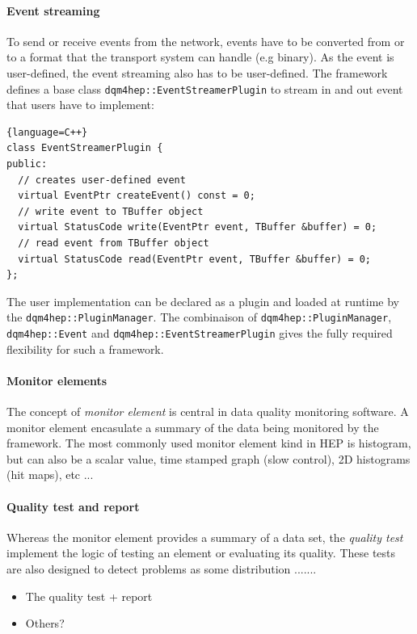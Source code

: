 \documentclass{webofc}
\begin{document}
\paragraph{Event streaming}

To send or receive events from the network, events have to be converted from or to a format that the transport system can handle (e.g binary). 
As the event is user-defined, the event streaming also has to be user-defined. 
The framework defines a base class \texttt{dqm4hep::EventStreamerPlugin} to stream in and out event that users have to implement:

\begin{lstlisting}{language=C++}
class EventStreamerPlugin {
public:
  // creates user-defined event
  virtual EventPtr createEvent() const = 0;
  // write event to TBuffer object
  virtual StatusCode write(EventPtr event, TBuffer &buffer) = 0;
  // read event from TBuffer object
  virtual StatusCode read(EventPtr event, TBuffer &buffer) = 0;
};
\end{lstlisting}

The user implementation can be declared as a plugin and loaded at runtime by the \texttt{dqm4hep::PluginManager}. 
The combinaison of \texttt{dqm4hep::PluginManager}, \texttt{dqm4hep::Event} and \texttt{dqm4hep::EventStreamerPlugin} gives the 
fully required flexibility for such a framework. 

\paragraph{Monitor elements}

The concept of \textit{monitor element} is central in data quality monitoring software.
A monitor element encasulate a summary of the data being monitored by the framework.
The most commonly used monitor element kind in HEP is histogram, but can also be a scalar value, 
time stamped graph (slow control), 2D histograms (hit maps), etc ...

\paragraph{Quality test and report}

Whereas the monitor element provides a summary of a data set, the \textit{quality test} implement the logic of testing an
element or evaluating its quality. These tests are also designed to detect problems as some distribution .......


\begin{itemize}
  \item The quality test + report
  \item Others?
\end{itemize}
\end{document}
